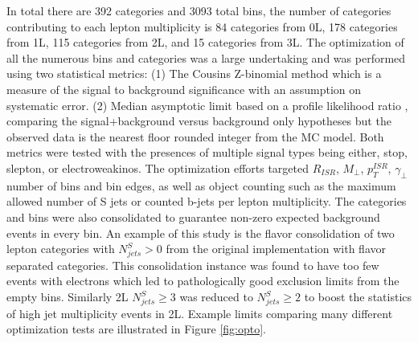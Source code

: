 In total there are 392 categories and 3093 total bins, the number of categories contributing to each lepton multiplicity is 84 categories from 0L, 178 categories from 1L, 115 categories from 2L, and 15 categories from 3L. The optimization of all the numerous bins and categories was a large undertaking and was performed using two statistical metrics: (1) The Cousins Z-binomial method \cite{Cousins_2008} which is a measure of the signal to background significance with an assumption on systematic error. (2)  Median asymptotic limit based on a profile likelihood ratio \cite{Cowan:2010js}, comparing the signal+background versus background only hypotheses but the observed data is the nearest floor rounded integer from the MC model. Both metrics were tested with the presences of multiple signal types being either, stop, slepton, or electroweakinos. The optimization efforts targeted $R_{ISR}$, $M_\perp$, $p_T^{ISR}$, $\gamma_\perp$ number of bins and bin edges, as well as object counting such as the  maximum allowed number of S jets or counted b-jets per lepton multiplicity. The categories and bins were also consolidated to guarantee non-zero expected background events in every bin. An example of this study is the flavor consolidation of two lepton categories with $N_{jets}^S > 0$ from the original implementation with flavor separated categories. This consolidation instance was found to have too few events with electrons which led to pathologically good exclusion limits from the empty bins. Similarly 2L $N_{jets}^S \geq 3$  was reduced to $N_{jets}^S \geq 2$ to boost the statistics of high jet multiplicity events in 2L. Example limits comparing many different optimization tests are illustrated in Figure \ref{fig:opto}.

